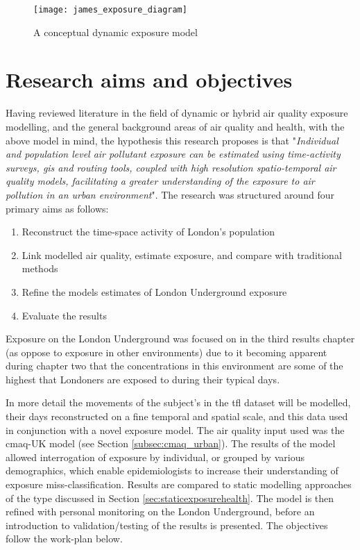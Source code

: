 \begin{figure}[H]
\centering
\texttt{[image: james\_exposure\_diagram]}
\caption{A conceptual dynamic exposure model}
\label{fig:james_exposure_diagram}
\end{figure}

\section{Research aims and objectives}
\label{sec:intro_aims_and_objectives}

Having reviewed literature in the field of dynamic or hybrid air quality exposure modelling, and the general background areas of air quality and health, with the above model in mind, the hypothesis this research proposes is that "\textit{Individual and population level air pollutant exposure can be estimated using time-activity surveys, \gls{gis} and routing tools, coupled with high resolution spatio-temporal air quality models, facilitating a greater understanding of the exposure to air pollution in an urban environment}". The research was structured around four primary aims as follows:

\begin{enumerate}
\item Reconstruct the time-space activity of London's population
\item Link modelled air quality, estimate exposure, and compare with traditional methods
\item Refine the models estimates of London Underground exposure
\item Evaluate the results
\end{enumerate}

Exposure on the London Underground was focused on in the third results chapter (as oppose to exposure in other environments) due to it becoming apparent during chapter two that the concentrations in this environment are some of the highest that Londoners are exposed to during their typical days.

In more detail the movements of the subject's in the \gls{tfl} dataset will be modelled, their days reconstructed on a fine temporal and spatial scale, and this data used in conjunction with a novel exposure model. The air quality input used was the \gls{cmaq}-UK model (see Section \ref{subsec:cmaq_urban}). The results of the model allowed interrogation of exposure by individual, or grouped by various demographics, which enable epidemiologists to increase their understanding of exposure miss-classification. Results are compared to static modelling approaches of the type discussed in Section \ref{sec:staticexposurehealth}. The model is then refined with personal monitoring on the London Underground, before an introduction to validation/testing of the results is presented. The objectives follow the work-plan below.


